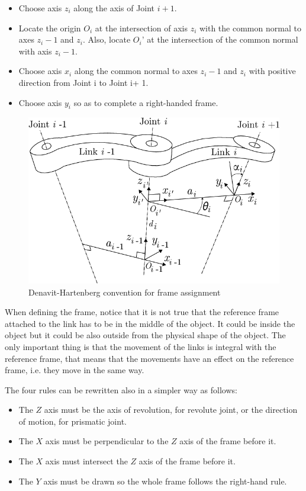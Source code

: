 \begin{itemize}
    \item Choose axis $z_i$ along the axis of Joint $i+ 1$.
    \item Locate the origin $O_i$ at the intersection of axis $z_i$ with the common normal to axes $z_i-1$ and $z_i$. Also, locate $O_i’$ at the intersection of the common normal with axis $z_i-1$.
    \item Choose axis $x_i$ along the common normal to axes $z_i-1$ and $z_i$ with positive direction from Joint i to Joint i+ 1.
    \item  Choose axis $y_i$ so as to complete a right-handed frame.
\end{itemize}

\begin{figure}[!h]
\begin{center}
\includegraphics[width=0.6\linewidth]{capitolo3/figure/DHconvention.png}
\caption{Denavit-Hartenberg convention for frame assignment}
\label{fig:DHconvention}
\end{center}
\end{figure}

When defining the frame, notice that it is not true that the reference frame attached to the link has to be in the middle of the object. It could be inside the object but it could be also outside from the physical shape of the object. The only important thing is that the movement of the links is integral with the reference frame, that means that the movements have an effect on the reference frame, i.e. they move in the same way.

The four rules can be rewritten also in a simpler way as follows:
\begin{itemize}
    \item The $Z$ axis must be the axis of revolution, for revolute joint, or the direction of motion, for prismatic joint.
    \item The $X$ axis must be perpendicular to the $Z$ axis of the frame before it.
    \item The $X$ axis must intersect the $Z$ axis of the frame before it.
    \item The $Y$ axis must be drawn so the whole frame follows the right-hand rule.
\end{itemize}


